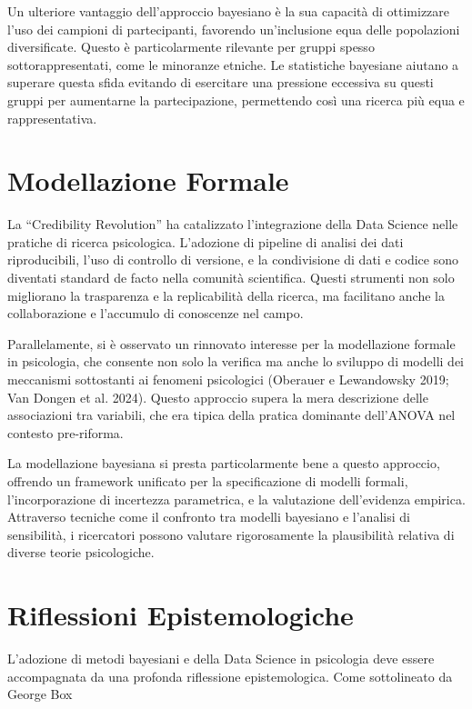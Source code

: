 \documentclass[
  letterpaper,
  krantz2]{{[}./krantz{]}}
\begin{document}
Un ulteriore vantaggio dell'approccio bayesiano è la sua capacità di
ottimizzare l'uso dei campioni di partecipanti, favorendo un'inclusione
equa delle popolazioni diversificate. Questo è particolarmente rilevante
per gruppi spesso sottorappresentati, come le minoranze etniche. Le
statistiche bayesiane aiutano a superare questa sfida evitando di
esercitare una pressione eccessiva su questi gruppi per aumentarne la
partecipazione, permettendo così una ricerca più equa e rappresentativa.

\section{Modellazione Formale}\label{modellazione-formale}

La ``Credibility Revolution'' ha catalizzato l'integrazione della Data
Science nelle pratiche di ricerca psicologica. L'adozione di pipeline di
analisi dei dati riproducibili, l'uso di controllo di versione, e la
condivisione di dati e codice sono diventati standard de facto nella
comunità scientifica. Questi strumenti non solo migliorano la
trasparenza e la replicabilità della ricerca, ma facilitano anche la
collaborazione e l'accumulo di conoscenze nel campo.

Parallelamente, si è osservato un rinnovato interesse per la
modellazione formale in psicologia, che consente non solo la verifica ma
anche lo sviluppo di modelli dei meccanismi sottostanti ai fenomeni
psicologici (Oberauer e Lewandowsky 2019; Van Dongen et al. 2024).
Questo approccio supera la mera descrizione delle associazioni tra
variabili, che era tipica della pratica dominante dell'ANOVA nel
contesto pre-riforma.

La modellazione bayesiana si presta particolarmente bene a questo
approccio, offrendo un framework unificato per la specificazione di
modelli formali, l'incorporazione di incertezza parametrica, e la
valutazione dell'evidenza empirica. Attraverso tecniche come il
confronto tra modelli bayesiano e l'analisi di sensibilità, i
ricercatori possono valutare rigorosamente la plausibilità relativa di
diverse teorie psicologiche.

\section{Riflessioni Epistemologiche}\label{riflessioni-epistemologiche}

L'adozione di metodi bayesiani e della Data Science in psicologia deve
essere accompagnata da una profonda riflessione epistemologica. Come
sottolineato da George Box
\end{document}
